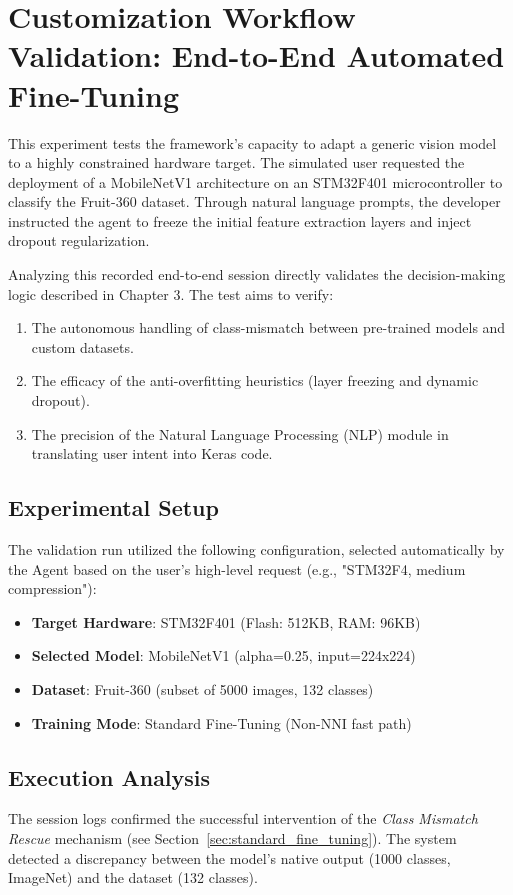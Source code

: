 \section{Customization Workflow Validation: End-to-End Automated Fine-Tuning}
\label{sec:auto_finetuning_results}

This experiment tests the framework's capacity to adapt a generic vision model to a highly constrained hardware target. The simulated user requested the deployment of a MobileNetV1 architecture on an STM32F401 microcontroller to classify the Fruit-360 dataset. Through natural language prompts, the developer instructed the agent to freeze the initial feature extraction layers and inject dropout regularization. 

Analyzing this recorded end-to-end session directly validates the decision-making logic described in Chapter 3. The test aims to verify:
\begin{enumerate}
    \item The autonomous handling of class-mismatch between pre-trained models and custom datasets.
    \item The efficacy of the anti-overfitting heuristics (layer freezing and dynamic dropout).
    \item The precision of the Natural Language Processing (NLP) module in translating user intent into Keras code.
\end{enumerate}

\subsection{Experimental Setup}
The validation run utilized the following configuration, selected automatically by the Agent based on the user's high-level request (e.g., "STM32F4, medium compression"):

\begin{itemize}
    \item \textbf{Target Hardware}: STM32F401 (Flash: 512KB, RAM: 96KB)
    \item \textbf{Selected Model}: MobileNetV1 (alpha=0.25, input=224x224)
    \item \textbf{Dataset}: Fruit-360 (subset of 5000 images, 132 classes)
    \item \textbf{Training Mode}: Standard Fine-Tuning (Non-NNI fast path)
\end{itemize}

\subsection{Execution Analysis}
The session logs confirmed the successful intervention of the \textit{Class Mismatch Rescue} mechanism (see Section~\ref{sec:standard_fine_tuning}). The system detected a discrepancy between the model's native output (1000 classes, ImageNet) and the dataset (132 classes).

